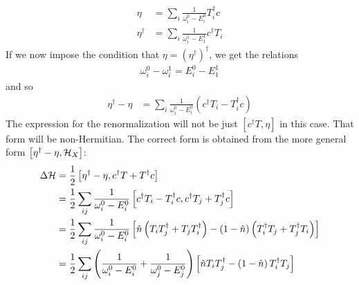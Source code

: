 \documentclass[12pt,twoside]{report}
\numberwithin{equation}{section}
\begin{document}
\begin{equation}\begin{aligned}
	\eta &= \sum_i \frac{1}{\omega^0_i - E^0_i} T_i^\dagger c\\
	\eta^\dagger &= \sum_i \frac{1}{\omega^1_i - E^1_1}c^\dagger T_i
\end{aligned}\end{equation}
If we now impose the condition that \(\eta =  \left( \eta^\dagger \right) ^\dagger\), we get the relations
\begin{equation}\begin{aligned}
	\omega^0_i - \omega^1_i = E^0_i - E^1_1
\end{aligned}\end{equation}
and so
\begin{equation}\begin{aligned}
	\eta^\dagger - \eta &= \sum_i \frac{1}{\omega^0_i - E^0_i}\left(c^\dagger T_i - T_i^\dagger c\right)
\end{aligned}\end{equation}
The expression for the renormalization will not be just \(\left[c^\dagger T, \eta \right]\) in this case. That form will be non-Hermitian. The correct form is obtained from the more general form \(\left[\eta^\dagger - \eta, \mathcal{H}_X \right]\):
\begin{equation}\begin{aligned}
	\Delta \mathcal{H} &= \frac{1}{2}\left[\eta^\dagger - \eta, c^\dagger T + T^\dagger c\right]\\
		    &= \frac{1}{2}\sum_{ij} \frac{1}{\omega^0_i - E^0_i}\left[c^\dagger T_i - T_i^\dagger c, c^\dagger T_j + T_j^\dagger c\right]\\
		    &= \frac{1}{2}\sum_{ij} \frac{1}{\omega^0_i - E^0_i}\left[\hat n \left(T_i T_j^\dagger + T_j T_i^\dagger \right) - \left(1 - \hat n\right)\left(T_i^\dagger T_j + T_j^\dagger T_i\right)\right]\\
		    &= \frac{1}{2}\sum_{ij} \left(\frac{1}{\omega^0_i - E^0_i} + \frac{1}{\omega^0_j - E^0_j}\right)\left[\hat n T_i T_j^\dagger - \left(1 - \hat n\right)T_i^\dagger T_j\right]\\ 
\end{aligned}\end{equation}
\end{document}
